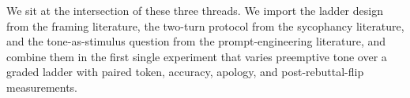  We sit at the intersection of these three threads. We import the ladder design from the framing literature, the \flipflop two-turn protocol from the sycophancy literature, and the tone-as-stimulus question from the prompt-engineering literature, and combine them in the first single experiment that varies preemptive tone over a graded ladder with paired token, accuracy, apology, and post-rebuttal-flip measurements.
